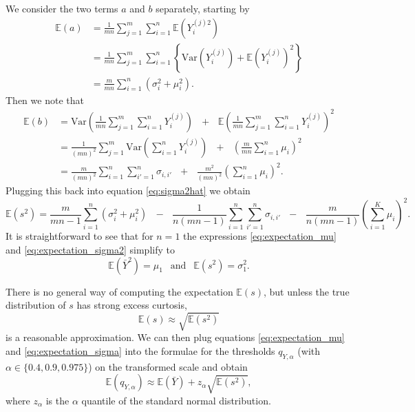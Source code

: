 \documentclass{article}
\newcommand{\sd}{s}
\newcommand{\mean}{\bar{Y}}
\begin{document}
We consider the two terms $a$ and $b$ separately, starting by
\begin{align*}
\mathbb{E}(a) & = \frac{1}{mn} \sum_{j = 1}^m \sum_{i = 1}^n \mathbb{E}\left(Y_i^{(j)2}\right)\\
& = \frac{1}{mn} \sum_{j = 1}^m \sum_{i = 1}^n \left\{ \text{Var}\left(Y_i^{(j)}\right) + \mathbb{E}\left(Y_i^{(j)}\right)^2 \right\}\\
& = \frac{m}{mn} \sum_{i = 1}^n (\sigma_{i}^2 + \mu_i^2).
\end{align*}
Then we note that
\begin{align*}
\mathbb{E}(b) & = \text{Var}\left( \frac{1}{mn} \sum_{j = 1}^m \sum_{i = 1}^n Y_i^{(j)} \right) \ \ \ + \ \ \ \mathbb{E}\left(\frac{1}{mn}  \sum_{j = 1}^m \sum_{i = 1}^n Y_i^{(j)} \right)^2\\
& = \frac{1}{(mn)^2}\sum_{j = 1}^m \text{Var}\left(\sum_{i = 1}^n Y_i^{(j)} \right) \ \ \ + \ \ \ \left(\frac{m}{mn} \sum_{i = 1}^n \mu_i\right)^2\\
& = \frac{m}{(mn)^2} \sum_{i = 1}^n \sum_{i' = 1}^n \sigma_{i,i'} \ \ \ + \ \ \ \frac{m^2}{(mn)^2}\left(\sum_{i = 1}^n \mu_i\right)^2.
\end{align*}
Plugging this back into equation \eqref{eq:sigma2hat} we obtain
\begin{equation}
\mathbb{E}(\sd^2) = \frac{m}{mn - 1} \sum_{i = 1}^n (\sigma_{i}^2 + \mu_i^2) \ \ \ - \ \ \ \frac{1}{n(mn - 1)} \sum_{i = 1}^n \sum_{i' = 1}^n \sigma_{i,i'} \ \ \ - \ \ \ \frac{m}{n(mn - 1)}\left(\sum_{i = 1}^K \mu_i\right)^2.
\label{eq:expectation_sigma2}
\end{equation}
It is straightforward to see that for $n = 1$ the expressions \eqref{eq:expectation_mu} and \eqref{eq:expectation_sigma2} simplify to
$$
\mathbb{E}(\mean^2) = \mu_1 \ \ \text{ and } \ \ \mathbb{E}(\sd^2) = \sigma^2_1.
$$

There is no general way of computing the expectation $\mathbb{E}(\sd)$, but unless the true distribution of  $\sd$ has strong excess curtosis,
\begin{equation}
\mathbb{E}(\sd) \approx \sqrt{\mathbb{E}(\sd^2)}
\label{eq:expectation_sigma}
\end{equation}
is a reasonable approximation. We can then plug equations \eqref{eq:expectation_mu} and \eqref{eq:expectation_sigma} into the formulae for the thresholds $q_{Y, \alpha}$ (with $\alpha \in \{0.4, 0.9, 0.975\}$) on the transformed scale and obtain
$$
\mathbb{E}(q_{Y, \alpha}) \approx \mathbb{E}(\mean) + z_\alpha \sqrt{\mathbb{E}(\sd^2)},
$$
where $z_\alpha$ is the $\alpha$ quantile of the standard normal distribution.
\end{document}
